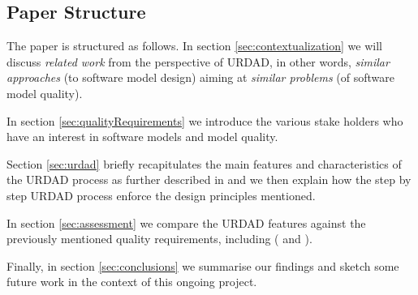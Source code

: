 
\subsection{Paper Structure}
The paper is structured as follows. In section \ref{sec:contextualization} we will discuss \emph{related work} from the perspective of URDAD, in other words, \emph{similar approaches} (to software model design) aiming at \emph{similar problems} (of software model quality).

In section \ref{sec:qualityRequirements} we introduce the various stake holders who have an
interest in software models and model quality. 

Section \ref{sec:urdad} briefly recapitulates the main features and characteristics of the URDAD process as further described in \cite{solms_2009:generatingMdasPimUsingUrdad} and we then explain how the step by step URDAD process enforce the design principles mentioned.

In section \ref{sec:assessment} we compare the URDAD features against the previously mentioned quality requirements, including (\cite{lange_2006:improvingTheQualityOfUmlModelsInPractice} and \cite{mohagheghi_2007:evaluatingQualityInModelDrivenEngineering}).

Finally, in section \ref{sec:conclusions} we summarise our findings and sketch some future
work in the context of this ongoing project. 
